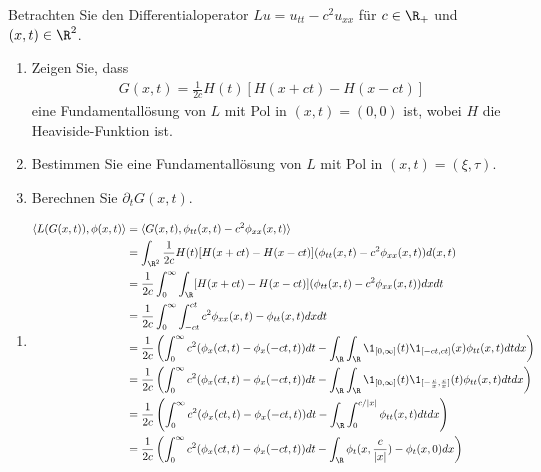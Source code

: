 
\begin{exercise}

Betrachten Sie den Differentialoperator $Lu = u_{tt} - c^2u_{xx}$ für $c \in \R_+$
und $(x,t) \in \R^2$.
\begin{enumerate}[label = (\roman*)]
  \item Zeigen Sie, dass
  \begin{align*}
    G(x,t) = \frac{1}{2c}H(t)[H(x+ct) - H(x-ct)]
  \end{align*}
  eine Fundamentallösung von $L$ mit Pol in $(x,t) = (0,0)$ ist, wobei $H$
  die Heaviside-Funktion ist.
  \item Bestimmen Sie eine Fundamentallösung von $L$ mit Pol in $(x,t) = (\xi,\tau)$.
  \item Berechnen Sie $\partial_tG(x,t)$.
\end{enumerate}
\end{exercise}


\begin{solution}

\phantom{}
\begin{enumerate}[label = (\roman*)]
  \item
  \begin{align*}
    \langle L(G(x,t)), \phi(x,t)\rangle
    &= \langle G(x,t), \phi_{tt}(x,t) - c^2\phi_{xx}(x,t)\rangle \\
    &= \int_{\R^2}\frac{1}{2c}H(t)[H(x+ct) - H(x-ct)](\phi_{tt}(x,t) - c^2\phi_{xx}(x,t))d(x,t) \\
    &= \frac{1}{2c}\int_{0}^{\infty}\int_{\R}[H(x+ct) - H(x-ct)](\phi_{tt}(x,t) - c^2\phi_{xx}(x,t)) dx dt \\
    &=  \frac{1}{2c}\int_{0}^{\infty}\int_{-ct}^{ct}c^2\phi_{xx}(x,t) - \phi_{tt}(x,t) dx  dt \\
    &=  \frac{1}{2c}\left(\int_{0}^{\infty}c^2(\phi_{x}(ct,t) - \phi_x(-ct,t))dt -
     \int_{\R}\int_{\R}\1_{[0,\infty]}(t)\1_{[-ct,ct]}(x) \phi_{tt}(x,t) dt dx\right) \\
    &=  \frac{1}{2c}\left(\int_{0}^{\infty}c^2(\phi_{x}(ct,t) - \phi_x(-ct,t))dt -
    \int_{\R}\int_{\R}\1_{[0,\infty]}(t)\1_{[-\frac{c}{x},\frac{c}{x}]}(t) \phi_{tt}(x,t) dt dx\right) \\
    &=  \frac{1}{2c}\left(\int_{0}^{\infty}c^2(\phi_{x}(ct,t) - \phi_x(-ct,t))dt -
    \int_{\R}\int_0^{c/|x|} \phi_{tt}(x,t) dt dx\right) \\
    &=  \frac{1}{2c}\left(\int_{0}^{\infty}c^2(\phi_{x}(ct,t) - \phi_x(-ct,t))dt -
    \int_{\R}\phi_t(x,\frac{c}{|x|}) - \phi_t(x,0) dx\right) \\
  \end{align*}
\end{enumerate}

\end{solution}

